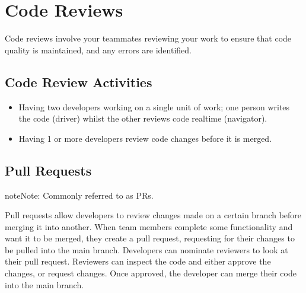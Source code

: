 \documentclass[letterpaper,10pt,english]{jupyterBook}
\begin{document}
\section{Code Reviews}
\label{\detokenize{chapter_6/github:code-reviews}}
\sphinxAtStartPar
Code reviews involve your teammates reviewing your work to ensure that
code quality is maintained, and any errors are identified.


\subsection{Code Review Activities}
\label{\detokenize{chapter_6/github:code-review-activities}}\begin{itemize}
\item {} 
\sphinxAtStartPar
{} Having two developers working on a single unit of
work; one person writes the code (driver) whilst the other reviews
code real\sphinxhyphen{}time (navigator).

\item {} 
\sphinxAtStartPar
{} Having 1 or more developers review code changes
before it is merged.

\end{itemize}


\subsection{Pull Requests}
\label{\detokenize{chapter_6/github:pull-requests}}
\begin{sphinxadmonition}{note}{Note:}
\sphinxAtStartPar
Commonly referred to as PRs.
\end{sphinxadmonition}

\sphinxAtStartPar
Pull requests allow developers to review changes made on a certain
branch before merging it into another. When team members complete some
functionality and want it to be merged, they create a pull request,
requesting for their changes to be pulled into the main branch.
Developers can nominate reviewers to look at their pull request.
Reviewers can inspect the code and either approve the changes, or
request changes. Once approved, the developer can merge their code into
the main branch.
\end{document}
